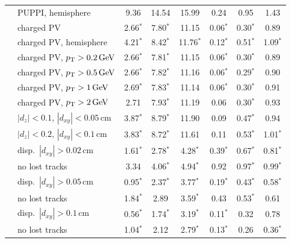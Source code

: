 \begin{table}[htbp]
\begin{tabular}{llcccccc}
 & PUPPI, hemisphere & 9.36 & 14.54 & 15.99 & 0.24 & 0.95 & 1.43 \\
 & charged PV & 2.66$^*$ & 7.80$^*$ & 11.15 & 0.06$^*$ & 0.30$^*$ & 0.89 \\
 & charged PV, hemisphere & 4.21$^*$ & 8.42$^*$ & 11.76$^*$ & 0.12$^*$ & 0.51$^*$ & 1.09$^*$ \\
 & charged PV, $p_{\mathrm{T}} > 0.2\,\mathrm{GeV}$ & 2.66$^*$ & 7.81$^*$ & 11.15 & 0.06$^*$ & 0.30$^*$ & 0.89 \\
 & charged PV, $p_{\mathrm{T}} > 0.5\,\mathrm{GeV}$ & 2.66$^*$ & 7.82$^*$ & 11.16 & 0.06$^*$ & 0.29$^*$ & 0.90 \\
 & charged PV, $p_{\mathrm{T}} > 1\,\mathrm{GeV}$ & 2.69$^*$ & 7.83$^*$ & 11.14 & 0.06$^*$ & 0.30$^*$ & 0.91 \\
 & charged PV, $p_{\mathrm{T}} > 2\,\mathrm{GeV}$ & 2.71 & 7.93$^*$ & 11.19 & 0.06 & 0.30$^*$ & 0.93 \\
 & $|d_z| < 0.1$, $|d_{xy}| < 0.05$\,cm & 3.87$^*$ & 8.79$^*$ & 11.90 & 0.09 & 0.47$^*$ & 0.94 \\
 & $|d_z| < 0.2$, $|d_{xy}| < 0.1$\,cm & 3.83$^*$ & 8.72$^*$ & 11.61 & 0.11 & 0.53$^*$ & 1.01$^*$ \\
 & disp.\ $|d_{xy}| > 0.02$\,cm & 1.61$^*$ & 2.78$^*$ & 4.28$^*$ & 0.39$^*$ & 0.67$^*$ & 0.81$^*$ \\
 & \quad no lost tracks & 3.34 & 4.06$^*$ & 4.94$^*$ & 0.92 & 0.97$^*$ & 0.99$^*$ \\
 & disp.\ $|d_{xy}| > 0.05$\,cm & 0.95$^*$ & 2.37$^*$ & 3.77$^*$ & 0.19$^*$ & 0.43$^*$ & 0.58$^*$ \\
 & \quad no lost tracks & 1.84$^*$ & 2.89 & 3.59$^*$ & 0.43 & 0.53$^*$ & 0.61 \\
 & disp.\ $|d_{xy}| > 0.1$\,cm & 0.56$^*$ & 1.74$^*$ & 3.19$^*$ & 0.11$^*$ & 0.32 & 0.78 \\
 & \quad no lost tracks & 1.04$^*$ & 2.12 & 2.79$^*$ & 0.13$^*$ & 0.26 & 0.36$^*$ \\
\bottomrule
\end{tabular}
\end{table}

